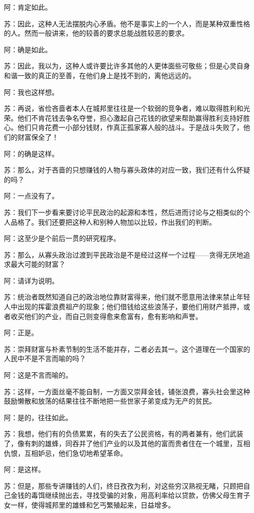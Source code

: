 \documentclass[12pt,oneside]{book}
\begin{document}
阿：肯定如此。

苏：因此，这种人无法摆脱内心矛盾。他不是事实上的一个人，而是某种双重性格的人。然而一般讲来，他的较善的要求总能战胜较恶的要求。

阿：确是如此。

苏：因此，我以为，这种人或许要比许多其他的人更体面些可敬些；但是心灵自身和谐一致的真正的至善，在他们身上是找不到的，离他远远的。

阿：我也这样想。

苏：再说，省俭吝啬者本人在城邦里往往是一个软弱的竞争者，难以取得胜利和光荣。他们不肯花钱去争名夺誉，担心激起自己花钱的欲望来帮助赢得胜利支持好胜心。他们只肯花费一小部分钱财，作真正孤家寡人般的战斗。于是战斗失败了，他们的财富保全了！

阿：的确是这样。

苏：那么，对于吝啬的只想赚钱的人物与寡头政体的对应一致，我们还有什么怀疑的吗？

阿：一点没有了。

苏：我们下一步看来要讨论平民政治的起源和本性，然后进而讨论与之相类似的个人品格了。我们还要把这种人和别种人物加以比较，作出我们的判断。

阿：这至少是个前后一贯的研究程序。

苏：那么，从寡头政治过渡到平民政治是不是经过这样一个过程——贪得无厌地追求最大可能的财富？

阿：请详为说明。

苏：统治者既然知道自己的政治地位靠财富得来，他们就不愿意用法律来禁止年轻人中出现的挥霍浪费祖产的现象；他们借钱给这些浪荡子，要他们用财产抵押，或者收买他们的产业，而自己则变得愈来愈富有，愈有影响和声誉。

阿：正是。

苏：崇拜财富与朴素节制的生活不能并存，二者必去其一。这个道理在一个国家的人民中不是不言而喻的吗？

阿：这是不言而喻的。

苏：这样，一方面丝毫不能自制，一方面又崇拜金钱，铺张浪费，寡头社会里这种鼓励懒散和放荡的结果往往不断地把一些世家子弟变成为无产的贫民。

阿：是的，往往如此。

苏：我想，他们有的负债累累，有的失去了公民资格，有的两者兼有，他们武装了，像有刺的雄蜂，同吞并了他们产业的以及其他的富而贵者住在一个城里，互相仇恨，互相妒忌，他们急切地希望革命。

阿：是这样。

苏：但是，那些专讲赚钱的人们，终日孜孜为利，对这些穷汉熟视无睹，只顾把自己金钱的毒饵继续抛出去，寻找受骗的对象，用高利率给以贷款，仿佛父母生育子女一样，使得城邦里的雄蜂和乞丐繁殖起来，日益增多。
\end{document}
